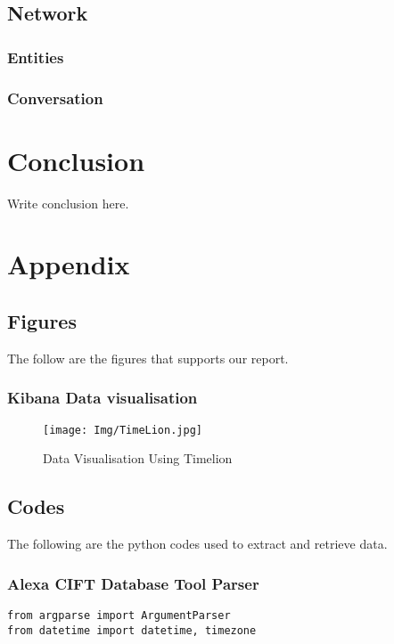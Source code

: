 \documentclass{easychair}
\begin{document}
\begin{enumerate}
\subsection{Network}
\subsubsection{Entities}
\subsubsection{Conversation}


\section{Conclusion}
\label{sect:conclusion} Write conclusion here.



\section{Appendix}

\subsection{Figures}
The follow are the figures that supports our report.
\subsubsection{Kibana Data visualisation}
\begin{figure}[h]
    \centering
    \texttt{[image: Img/TimeLion.jpg]}
    \caption{Data Visualisation Using Timelion}
    \label{fig:Drug Lab}
\end{figure}

\subsection{Codes}
The following are the python codes used to extract and retrieve data.
\subsubsection{Alexa CIFT Database Tool Parser}


\lstset{language=Python}
\lstset{frame=lines}
\lstset{basicstyle=\footnotesize}
\begin{lstlisting}
from argparse import ArgumentParser
from datetime import datetime, timezone


\end{lstlisting}
\end{enumerate}
\end{document}
